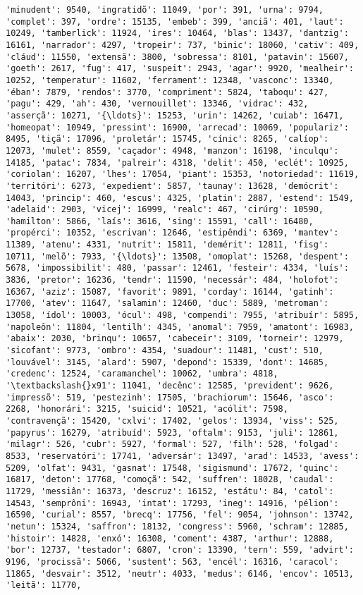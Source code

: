 \documentclass[11pt]{article}
\begin{document}
\begin{Verbatim}[commandchars=\\\{\}]
'minudent': 9540, 'ingratidõ': 11049, 'por': 391, 'urna': 9794, 'complet': 397, 'ordre': 15135, 'embeb': 399, 'anciã': 401, 'laut': 10249, 'tamberlick': 11924, 'ires': 10464, 'blas': 13437, 'dantzig': 16161, 'narrador': 4297, 'tropeir': 737, 'binic': 18060, 'cativ': 409, 'cláud': 11550, 'extensã': 3800, 'sobressa': 8101, 'patavin': 15607, 'goeth': 2617, 'fug': 417, 'suspeit': 2943, 'agar': 9920, 'mealheir': 10252, 'temperatur': 11602, 'ferrament': 12348, 'vasconc': 13340, 'éban': 7879, 'rendos': 3770, 'compriment': 5824, 'taboqu': 427, 'pagu': 429, 'ah': 430, 'vernouillet': 13346, 'vidrac': 432, 'asserçã': 10271, '{\ldots}': 15253, 'urin': 14262, 'cuiab': 16471, 'homeopat': 10949, 'pressint': 16900, 'arrecad': 10069, 'populariz': 8495, 'tiçã': 17096, 'proletár': 15745, 'cínic': 8265, 'calíop': 12073, 'mulet': 8559, 'caçador': 4948, 'manzon': 16198, 'inculqu': 14185, 'patac': 7834, 'palreir': 4318, 'delit': 450, 'eclét': 10925, 'coriolan': 16207, 'lhes': 17054, 'piant': 15353, 'notoriedad': 11619, 'territóri': 6273, 'expedient': 5857, 'taunay': 13628, 'demócrit': 14043, 'princip': 460, 'escus': 4325, 'platin': 2887, 'estend': 1549, 'adelaid': 2903, 'vicej': 16999, 'realc': 467, 'cirúrg': 10590, 'hamilton': 5866, 'laís': 3616, 'sing': 15591, 'call': 16480, 'propérci': 10352, 'escrivan': 12646, 'estipêndi': 6369, 'mantev': 11389, 'atenu': 4331, 'nutrit': 15811, 'demérit': 12811, 'fisg': 10711, 'melõ': 7933, '{\ldots}': 13508, 'omoplat': 15268, 'despent': 5678, 'impossibilit': 480, 'passar': 12461, 'festeir': 4334, 'luís': 3836, 'pretor': 16236, 'tendr': 11590, 'necessár': 484, 'holofot': 16367, 'aziz': 15087, 'favorit': 9891, 'corday': 16144, 'gatinh': 17700, 'atev': 11647, 'salamin': 12460, 'duc': 5889, 'metroman': 13058, 'ídol': 10003, 'ócul': 498, 'compendi': 7955, 'atribuír': 5895, 'napoleôn': 11804, 'lentilh': 4345, 'anomal': 7959, 'amatont': 16983, 'abaix': 2030, 'brinqu': 10657, 'cabeceir': 3109, 'torneir': 12979, 'sicofant': 9773, 'ombro': 4354, 'suadour': 11481, 'cust': 510, 'louvável': 3145, 'alard': 5907, 'depond': 15339, 'dont': 14685, 'credenc': 12524, 'caramanchel': 10062, 'umbra': 4818, '\textbackslash{}x91': 11041, 'decênc': 12585, 'prevident': 9626, 'impressõ': 519, 'pestezinh': 17505, 'brachiorum': 15646, 'asco': 2268, 'honorári': 3215, 'suicid': 10521, 'acólit': 7598, 'contravençã': 15420, 'cxlvi': 17402, 'gelos': 13934, 'viss': 525, 'papyrus': 16279, 'atribuíd': 5923, 'oftalm': 9153, 'juli': 12861, 'milagr': 526, 'cubr': 5927, 'formal': 527, 'filh': 528, 'folgad': 8533, 'reservatóri': 17741, 'adversár': 13497, 'arad': 14533, 'avess': 5209, 'olfat': 9431, 'gasnat': 17548, 'sigismund': 17672, 'quinc': 16817, 'deton': 17768, 'comoçã': 542, 'suffren': 18028, 'caudal': 11729, 'messiân': 16373, 'descruz': 16152, 'estátu': 84, 'catol': 14543, 'semprôni': 16943, 'intat': 17293, 'ineg': 14916, 'pélion': 16590, 'curial': 8557, 'brecq': 17756, 'fel': 9054, 'johnson': 13742, 'netun': 15324, 'saffron': 18132, 'congress': 5960, 'schram': 12885, 'histoir': 14828, 'enxó': 16308, 'coment': 4387, 'arthur': 12888, 'bor': 12737, 'testador': 6807, 'cron': 13390, 'tern': 559, 'advirt': 9196, 'procissã': 5066, 'sustent': 563, 'encél': 16316, 'caracol': 11865, 'desvair': 3512, 'neutr': 4033, 'medus': 6146, 'encov': 10513, 'leitã': 11770, 
\end{Verbatim}
\end{document}

